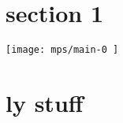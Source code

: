\documentclass[11pt]{article}
\begin{document}
    \section*{section 1}
    \texttt{[image:  mps/main-0 ]}


    \section{ly stuff}
    
\end{document}
